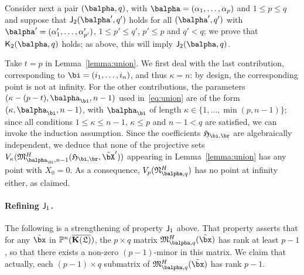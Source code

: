 \documentclass[12pt]{article}
\begin{document}
Consider next a pair $(\balpha,q)$, with
$\balpha=(\alpha_1,\dots,\alpha_p)$ and $1 \le p \le q$ and suppose
that $\assI_2(\balpha',q')$ holds for all $(\balpha',q')$ with
$\balpha'=(\alpha'_1,\dots,\alpha'_{p'})$, $1 \le p' \le q'$, $p' \le p$ and $q'
< q$; we prove that $\assJ_2(\balpha,q)$ holds; as above, this will
imply $\assI_2(\balpha,q)$.

Take $t=p$ in Lemma~\ref{lemma:union}. We first deal with the last
contribution, corresponding to $\bi=(i_1,\dots,i_n)$, and thus
$\kappa=n$: by design, the corresponding point is not at infinity. For
the other contributions, the parameters $(\kappa-(p-t),\balpha_\bi,n-1)$
used in~\eqref{eq:union} are of the form $(\kappa,\balpha_\bi,n-1)$, with
$\balpha_\bi$ of length $\kappa \in \{1,\dots, \min(p,n-1)\}$; since all
conditions $1 \le \kappa \le n-1$, $\kappa \le p$ and $n-1 < q$ are satisfied,
we can invoke the induction assumption. Since the coefficients
$\mathfrak{H}_{\bi,\br}$ are algebraically independent, we deduce that
none of the projective sets
$V_\kappa(\mathfrak{M}^H_{\balpha_\bi,n-1}(\mathfrak{H}_{\bi,\br},\tilde\bX'))$ appearing in
Lemma~\ref{lemma:union} has any point with $X_0=0$. As a consequence,
$V_p(\mathfrak{N}^H_{\balpha,q})$ has no point at infinity either, as
claimed.


\paragraph{Refining $\mathsf{J}_1$.} The following  is a strengthening of 
property $\mathsf{J}_1$ above. That property asserts that for any
$\tilde\bx$ in $\mathbb{P}^n(\overline{\mathbf{K}(\mathfrak{L})})$, the $p \times q$ matrix
$\mathfrak{M}^H_{\balpha,q}(\tilde\bx)$ has rank at least $p-1$, so
that there exists a non-zero $(p-1)$-minor in this matrix.  We claim
that actually, each $(p-1)\times q$ submatrix of
$\mathfrak{M}^H_{\balpha,q}(\tilde\bx)$ has rank $p-1$.
\end{document}
